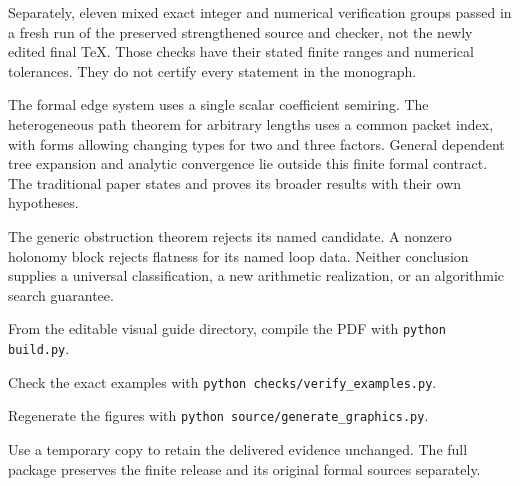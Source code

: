Separately, eleven mixed exact integer and numerical verification groups passed in a fresh run of the preserved strengthened source and checker, not the newly edited final TeX. Those checks have their stated finite ranges and numerical tolerances. They do not certify every statement in the monograph.

The formal edge system uses a single scalar coefficient semiring. The heterogeneous path theorem for arbitrary lengths uses a common packet index, with forms allowing changing types for two and three factors. General dependent tree expansion and analytic convergence lie outside this finite formal contract. The traditional paper states and proves its broader results with their own hypotheses.

The generic obstruction theorem rejects its named candidate. A nonzero holonomy block rejects flatness for its named loop data. Neither conclusion supplies a universal classification, a new arithmetic realization, or an algorithmic search guarantee.

From the editable visual guide directory, compile the PDF with \mbox{\texttt{python build.py}}.\par
Check the exact examples with \mbox{\texttt{python checks/verify\_examples.py}}.\par
Regenerate the figures with \mbox{\texttt{python source/generate\_graphics.py}}.\par
Use a temporary copy to retain the delivered evidence unchanged. The full package preserves the finite release and its original formal sources separately.

